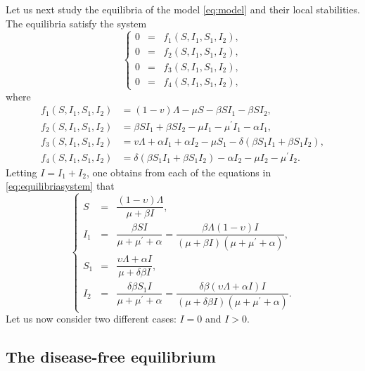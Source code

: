 \documentclass[11pt,reqno]{amsart}
\begin{document}
Let us next study the equilibria of the model \eqref{eq:model} and their local stabilities. The equilibria satisfy the system
\begin{equation}\label{eq:equilibriasystem}
\left\{\begin{array}{rcl}
0 \!\!\!&=&\!\!\!f_1\left(S,I_1,S_1,I_2\right),\\[0.1cm]
0 \!\!\!&=&\!\!\!f_2\left(S,I_1,S_1,I_2\right),\\[0.1cm]
0 \!\!\!&=&\!\!\!f_3\left(S,I_1,S_1,I_2\right),\\[0.1cm]
0 \!\!\!&=&\!\!\!f_4\left(S,I_1,S_1,I_2\right),\end{array}\right.
\end{equation}
where
\begin{align*}
f_1\left(S,I_1,S_1,I_2\right)&=\left( 1-v \right) \Lambda -\mu S-\beta SI_{1}-\beta SI_{2},\\
f_2\left(S,I_1,S_1,I_2\right)&=\beta SI_{1}+\beta SI_{2}-\mu
I_{1}-\mu ^{\prime }I_{1}-\alpha I_{1},\\
f_3\left(S,I_1,S_1,I_2\right)&=v \Lambda +\alpha I_{1}+\alpha I_{2} -\mu S_{1}-\delta \left( 
\beta S_{1}I_{1}+\beta S_{1}I_{2}\right),\\
f_4\left(S,I_1,S_1,I_2\right)&=\delta \left( \beta S_{1}I_{1}+\beta
S_{1}I_{2}\right) -\alpha I_{2}-\mu I_{2}-\mu ^{\prime }I_{2}.
\end{align*}
Letting $I=I_1+I_2$, one obtains from each of the equations in \eqref{eq:equilibriasystem} that
\begin{equation}\label{eq:equilibria}
\left\{\begin{array}{rcl}
S\!\!\!&=&\!\!\!\dfrac{\left(1-\upsilon\right)\Lambda}{\mu+\beta I},\\[0.3cm]
I_1\!\!\!&=&\!\!\!\dfrac{\beta SI}{\mu+\mu^\prime+\alpha}=\dfrac{\beta\Lambda\left(1-\upsilon\right)I}{\left(\mu+\beta I\right)\left(\mu+\mu^\prime+\alpha\right)},\\[0.3cm]
S_1\!\!\!&=&\!\!\!\dfrac{\upsilon\Lambda + \alpha I}{\mu+\delta\beta I},\\[0.3cm]
I_2\!\!\!&=&\!\!\!\dfrac{\delta\beta S_1 I}{\mu+\mu^\prime+\alpha}=\dfrac{\delta\beta\left(\upsilon\Lambda+\alpha I\right)I}{\left(\mu+\delta\beta I\right)\left(\mu+\mu^\prime+\alpha\right)}.
\end{array}\right.
\end{equation}
Let us now consider two different cases: $I=0$ and $I>0$.

\subsection{The disease-free equilibrium}
\end{document}
